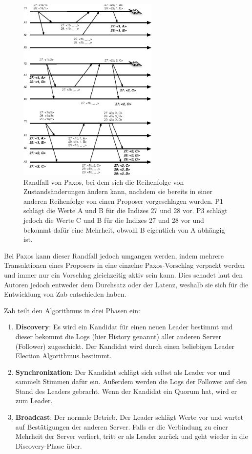 \begin{figure}[H]
	\centering
	\includegraphics[height=350px]{img/paxos_fail.png}
	\caption{Randfall von Paxos, bei dem sich die Reihenfolge von Zustandsänderungen ändern kann, nachdem sie bereits in einer anderen Reihenfolge von einen Proposer vorgeschlagen wurden. P1 schlägt die Werte A und B für die Indizes 27 und 28 vor. P3 schlägt jedoch die Werte C und B für die Indizes 27 und 28 vor und bekommt dafür eine Mehrheit, obwohl B eigentlich von A abhängig ist.}
	\label{fig:paxos_fail}
\end{figure}

Bei Paxos kann dieser Randfall jedoch umgangen werden, indem mehrere Transaktionen eines Proposers in eine einzelne Paxos-Vorschlag verpackt werden und immer nur ein Vorschlag gleichzeitig aktiv sein kann. Dies schadet laut den Autoren jedoch entweder dem Durchsatz oder der Latenz, weshalb sie sich für die Entwicklung von Zab entschieden haben.

Zab teilt den Algorithmus in drei Phasen ein:
\begin{enumerate}
	\item \textbf{Discovery}: Es wird ein Kandidat für einen neuen Leader bestimmt und dieser bekommt die Logs (hier History genannt) aller anderen Server (Follower) zugeschickt. Der Kandidat wird durch einen beliebigen Leader Election Algorithmus bestimmt.
	\item \textbf{Synchronization}: Der Kandidat schlägt sich selbst als Leader vor und sammelt Stimmen dafür ein. Außerdem werden die Logs der Follower auf den Stand des Leaders gebracht. Wenn der Kandidat ein Quorum hat, wird er zum Leader.
	\item \textbf{Broadcast}: Der normale Betrieb. Der Leader schlägt Werte vor und wartet auf Bestätigungen der anderen Server. Falls er die Verbindung zu einer Mehrheit der Server verliert,  tritt er als Leader zurück und geht wieder in die Discovery-Phase über.
\end{enumerate}


